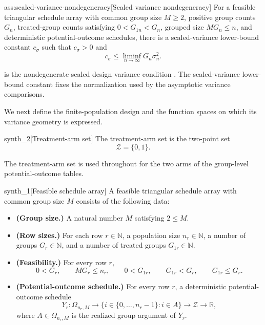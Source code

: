 \documentclass[11pt]{article}
\begin{document}
\begin{assumptionv}{ass:scaled-variance-nondegeneracy}[Scaled variance nondegeneracy]
For a feasible triangular schedule array with common group size \(M\ge 2\), positive group counts \(G_n\), treated-group counts satisfying \(0<G_{1n}<G_n\), grouped size \(MG_n\le n\), and deterministic potential-outcome schedules, there is a scaled-variance lower-bound constant \(c_\sigma\) such that \(c_\sigma>0\) and
\[
c_\sigma \le \liminf_{n\to\infty} G_n\sigma_n^2 .
\]
\end{assumptionv}

 is the nondegenerate scaled design variance condition \citep{LiDing2017}. The scaled-variance lower-bound constant  fixes the normalization used by the asymptotic variance comparisons.

We next define the finite-population design and the function spaces on which its variance geometry is expressed.

\begin{definitionv}{synth_2}[Treatment-arm set]
The treatment-arm set is the two-point set
\[
\mathcal Z=\{0,1\}.
\]
\end{definitionv}

The treatment-arm set  is used throughout for the two arms of the group-level potential-outcome tables.

\begin{definitionv}{synth_1}[Feasible schedule array]
A feasible triangular schedule array with common group size \(M\) consists of the following data:
\begin{itemize}
\item \textbf{(Group size.)} A natural number \(M\) satisfying \(2\le M\).
\item \textbf{(Row sizes.)} For each row \(r\in\mathbb N\), a population size \(n_r\in\mathbb N\), a number of groups \(G_r\in\mathbb N\), and a number of treated groups \(G_{1r}\in\mathbb N\).
\item \textbf{(Feasibility.)} For every row \(r\),
\[
0<G_r,\qquad M G_r\le n_r,\qquad 0<G_{1r},\qquad G_{1r}<G_r,\qquad G_{1r}\le G_r .
\]
\item \textbf{(Potential-outcome schedule.)} For every row \(r\), a deterministic potential-outcome schedule
\[
Y_r:\Omega_{n_r,M}\to \{i\in \{0,\ldots,n_r-1\}: i\in A\}\to \mathcal Z\to \mathbb R,
\]
where \(A\in\Omega_{n_r,M}\) is the realized group argument of \(Y_r\).
\end{itemize}
\end{definitionv}
\end{document}

